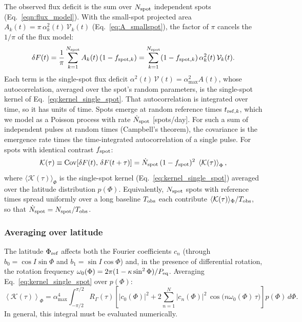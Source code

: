 \documentclass[preprint]{aastex702}
\newcommand{\Cov}{\mathrm{Cov}}
\begin{document}
The observed flux deficit is the sum over $N_{\rm spot}$ independent spots (Eq.~\ref{eqn:flux_model}). With the small-spot projected area $A_k(t) = \pi\,\alpha_k^2(t)\,\mathcal{V}_k(t)$ (Eq.~\ref{eq:A_smallspot}), the factor of $\pi$ cancels the $1/\pi$ of the flux model:
\begin{equation}
    \delta F(t) = \frac{1}{\pi}\sum_{k=1}^{N_{\rm spot}} A_k(t)\,(1 - f_{{\rm spot},k})
    = \sum_{k=1}^{N_{\rm spot}} (1 - f_{{\rm spot},k})\,\alpha_k^2(t)\,\mathcal{V}_k(t).
\end{equation}
Each term is the single-spot flux deficit $\alpha^2(t)\,\mathcal{V}(t) = \alpha_{\max}^2 A(t)$, whose autocorrelation, averaged over the spot's random parameters, is the single-spot kernel of Eq.~\eqref{eq:kernel_single_spot}. That autocorrelation is integrated over time, so it has units of time. Spots emerge at random reference times $t_{{\rm ref},k}$, which we model as a Poisson process with rate $\dot{N}_{\rm spot}$ [spots/day]. For such a sum of independent pulses at random times (Campbell's theorem), the covariance is the emergence rate times the time-integrated autocorrelation of a single pulse. For spots with identical contrast $f_{\rm spot}$:
\begin{equation}
    \mathcal{K}(\tau) \equiv \Cov[\delta F(t),\, \delta F(t+\tau)] = \dot{N}_{\rm spot}\,(1 - f_{\rm spot})^2\; \left\langle \mathcal{K}(\tau) \right\rangle_{\Phi},
    \label{eq:kernel_Nspot}
\end{equation}
where $\langle \mathcal{K}(\tau) \rangle_\Phi$ is the single-spot kernel (Eq.~\ref{eq:kernel_single_spot}) averaged over the latitude distribution $p(\Phi)$. Equivalently, $N_{\rm spot}$ spots with reference times spread uniformly over a long baseline $T_{\rm obs}$ each contribute $\langle \mathcal{K}(\tau) \rangle_\Phi / T_{\rm obs}$, so that $\dot{N}_{\rm spot} = N_{\rm spot}/T_{\rm obs}$.

\subsubsection{Averaging over latitude}

The latitude $\Phi_{\rm ref}$ affects both the Fourier coefficients $c_n$ (through $b_0 = \cos I\sin\Phi$ and $b_1 = \sin I\cos\Phi$) and, in the presence of differential rotation, the rotation frequency $\omega_0(\Phi) = 2\pi(1 - \kappa\sin^2\Phi)/P_{\rm eq}$. Averaging Eq.~\eqref{eq:kernel_single_spot} over $p(\Phi)$:
\begin{equation}
    \left\langle \mathcal{K}(\tau) \right\rangle_\Phi
    = \alpha_{\max}^4 \int_{-\pi/2}^{\pi/2} R_\Gamma(\tau) \left[ |c_0(\Phi)|^2 + 2\sum_{n=1}^{N} |c_n(\Phi)|^2\, \cos\!\big(n\omega_0(\Phi)\,\tau\big) \right] p(\Phi)\, d\Phi.
    \label{eq:kernel_lat_avg}
\end{equation}
In general, this integral must be evaluated numerically.
\end{document}
